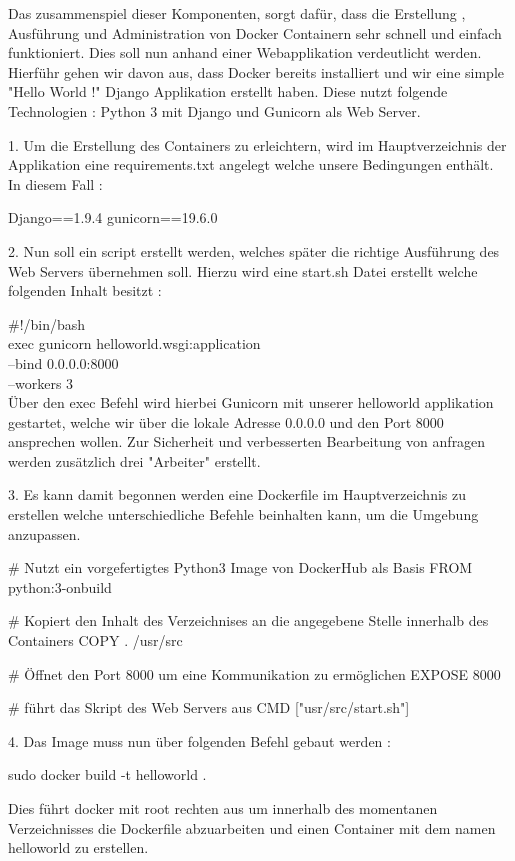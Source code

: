 \documentclass[12pt,toc=bib,toc=listof]{scrreprt}
\begin{document}
Das zusammenspiel dieser Komponenten, sorgt dafür, dass die Erstellung , Ausführung und Administration von Docker Containern sehr schnell und einfach funktioniert.
Dies soll nun anhand einer Webapplikation verdeutlicht werden.
Hierführ gehen wir davon aus, dass Docker bereits installiert und wir  eine  simple "Hello World !" Django Applikation erstellt haben.
Diese nutzt folgende Technologien : Python 3 mit Django und Gunicorn als Web Server.

1. Um die Erstellung des Containers zu erleichtern, wird im Hauptverzeichnis der Applikation eine requirements.txt angelegt welche unsere Bedingungen enthält.\\
In diesem Fall :

Django==1.9.4
gunicorn==19.6.0

2. Nun soll ein script erstellt werden, welches später die richtige Ausführung des Web Servers übernehmen soll.
Hierzu wird eine start.sh Datei erstellt welche folgenden Inhalt besitzt :

\#!/bin/bash\\
exec gunicorn helloworld.wsgi:application \ \\
--bind 0.0.0.0:8000 \ \\
--workers 3 \\ 

Über den exec Befehl wird hierbei Gunicorn mit unserer helloworld applikation gestartet, welche wir über die lokale Adresse 0.0.0.0 und den Port 8000 ansprechen wollen. Zur Sicherheit und verbesserten Bearbeitung von anfragen werden zusätzlich drei "Arbeiter" erstellt.

3. Es kann damit begonnen werden eine Dockerfile im Hauptverzeichnis zu erstellen welche unterschiedliche Befehle beinhalten kann, um die Umgebung anzupassen.

\# Nutzt ein vorgefertigtes Python3 Image von DockerHub als Basis
FROM python:3-onbuild

\# Kopiert den Inhalt des Verzeichnises an die angegebene Stelle innerhalb des Containers 
COPY . /usr/src

\# Öffnet den Port 8000 um eine Kommunikation zu ermöglichen
EXPOSE 8000

\# führt das Skript des Web Servers aus
CMD ["usr/src/start.sh"]

4. Das Image muss nun über folgenden Befehl gebaut werden :

sudo docker build -t helloworld .

Dies führt docker mit root rechten aus um innerhalb des momentanen Verzeichnisses die Dockerfile abzuarbeiten und einen Container mit dem namen helloworld zu erstellen.
\end{document}
